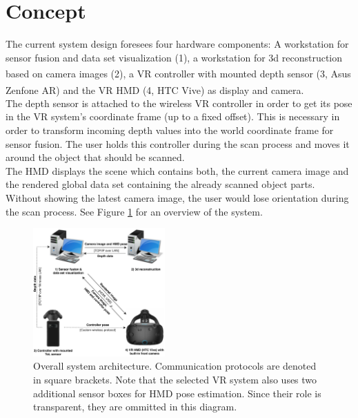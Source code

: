 \documentclass[conference]{IEEEtran}
\begin{document}
\section {Concept}
The current system design foresees four hardware components: A workstation for sensor fusion and data set visualization (1), a workstation for 3d reconstruction based on camera images (2), a VR controller with mounted depth sensor (3, Asus\textsuperscript{\textcopyright} Zenfone AR\texttrademark \space) and the VR HMD (4, HTC\textsuperscript{\textcopyright}  Vive\texttrademark \space) as display and camera.  
\\
The depth sensor is attached to the wireless VR controller in order to get its pose in the VR system's coordinate frame (up to a fixed offset). 
This is necessary in order to transform incoming depth values into the world coordinate frame for sensor fusion. 
The user holds this controller during the scan process and moves it around the object that should be scanned. 
\\
The HMD displays the scene which contains both, the current camera image and the rendered global data set containing the already scanned object parts. 
Without showing the latest camera image, the user would lose orientation during the scan process.
See Figure \ref{fig:system} for an overview of the system.
\begin{figure}[!htbp]
	\centerline{\includegraphics[width=0.45\textwidth]{figures/3dsystemoverview.pdf}}
	\caption{Overall system architecture. Communication protocols are denoted in square brackets. Note that the selected VR system also uses two additional sensor boxes for HMD pose estimation. Since their role is transparent, they are ommitted in this diagram. }
	\label{fig:system}
\end{figure}
\end{document}
